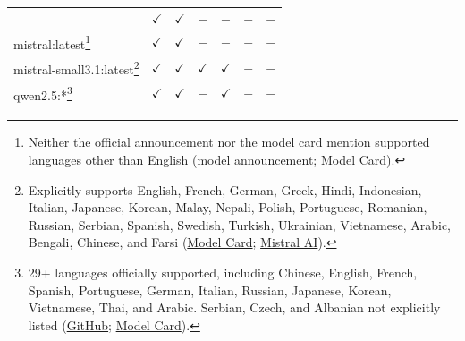 \begin{tabular*}{\textwidth}{@{\extracolsep{\fill}}lcccccc}
  & $\checkmark$ & $\checkmark$ & $-$ & $-$ & $-$ & $-$ \\
mistral:latest\footnote{Neither the official announcement nor the model card mention supported languages other than English (\href{https://mistral.ai/news/announcing-mistral-7b}{model announcement}; \href{https://huggingface.co/mistralai/Mistral-7B-v0.1}{Model Card}).}
  & $\checkmark$ & $\checkmark$ & $-$ & $-$ & $-$ & $-$ \\
mistral-small3.1:latest\footnote{Explicitly supports English, French, German, Greek, Hindi, Indonesian, Italian, Japanese, Korean, Malay, Nepali, Polish, Portuguese, Romanian, Russian, Serbian, Spanish, Swedish, Turkish, Ukrainian, Vietnamese, Arabic, Bengali, Chinese, and Farsi (\href{https://huggingface.co/mistralai/Mistral-Small-3.1-24B-Instruct-2503}{Model Card}; \href{https://mistral.ai/news/mistral-small-3-1}{Mistral AI}).}
  & $\checkmark$ & $\checkmark$ & $\checkmark$ & $\checkmark$ & $-$ & $-$ \\
qwen2.5:*\footnote{29+ languages officially supported, including Chinese, English, French, Spanish, Portuguese, German, Italian, Russian, Japanese, Korean, Vietnamese, Thai, and Arabic. Serbian, Czech, and Albanian not explicitly listed (\href{https://github.com/QwenLM/Qwen2.5}{GitHub}; \href{https://www.alibabacloud.com/help/en/model-studio/what-is-qwen-llm}{Model Card}).}
  & $\checkmark$ & $\checkmark$ & $-$ & $\checkmark$ & $-$ & $-$ \\
\bottomrule
\end{tabular*}
